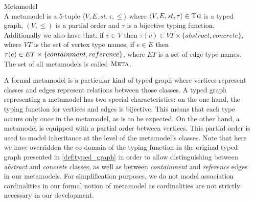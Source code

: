 \begin{definition}{Metamodel\\}
\label{def:metamodel}
A metamodel is a 5-tuple $\langle V,E,st,\tau,\leq\rangle$ where $\langle V,E,st,\tau\rangle\in \textsc{Tg}$ is a typed graph, $(V,\leq)$ is a partial order and $\tau$ is a bijective typing function. Additionally we also have that: if $v\in V$ then $\tau(v)\in VT\times \{abstract,concrete\}$, where $VT$ is the set of vertex type names; if $e\in E$ then $\tau(e)\in ET\times \{containment,\\reference\}$, where $ET$ is a set of edge type names. The set of all metamodels is called $\textsc{Meta}$.
\end{definition}




A formal metamodel is a particular kind of typed graph where vertices represent classes and edges represent relations between those classes. A typed graph representing a metamodel has two special characteristics: on the one hand, the typing function for vertices and edges is bijective. This means that each type occurs only once in the metamodel, as is to be expected. On the other hand, a metamodel is equipped with a partial order between vertices. This partial order is used to model inheritance at the level of the metamodel's classes. Note that here we have overridden the co-domain of the typing function in the original typed graph presented in \cref{def:typed_graph} in order to allow distinguishing between \emph{abstract} and \emph{concrete} classes, as well as between \emph{containment} and \emph{reference} edges in our metamodels. For simplification purposes, we do not model association cardinalities in our formal notion of metamodel as cardinalities are not strictly necessary in our development.

